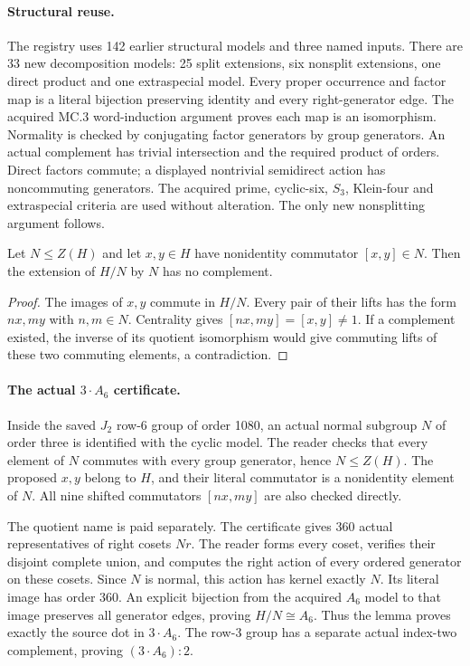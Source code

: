 \documentclass[11pt]{article}
\begin{document}
\paragraph{Structural reuse.}
The registry uses 142 earlier structural models and three named inputs.
There are 33 new decomposition models: 25 split extensions, six nonsplit
extensions, one direct product and one extraspecial model.
Every proper occurrence and factor map is a literal bijection preserving
identity and every right-generator edge. The acquired MC.3 word-induction
argument proves each map is an isomorphism. Normality is checked by
conjugating factor generators by group generators. An actual complement
has trivial intersection and the required product of orders. Direct factors
commute; a displayed nontrivial semidirect action has noncommuting generators.
The acquired prime, cyclic-six, $S_3$, Klein-four and extraspecial criteria
are used without alteration. The only new nonsplitting argument follows.

\newpage
\begin{lemma}
Let $N\leq Z(H)$ and let $x,y\in H$ have nonidentity commutator
$[x,y]\in N$. Then the extension of $H/N$ by $N$ has no complement.
\end{lemma}
\begin{proof}
The images of $x,y$ commute in $H/N$. Every pair of their lifts has the
form $nx,my$ with $n,m\in N$. Centrality gives
$[nx,my]=[x,y]\ne1$. If a complement existed, the inverse of its quotient
isomorphism would give commuting lifts of these two commuting elements,
a contradiction.
\end{proof}

\paragraph{The actual $3\mathbin{\cdot}A_6$ certificate.}
Inside the saved $J_2$ row-6 group of order 1080, an actual normal subgroup
$N$ of order three is identified with the cyclic model. The reader checks
that every element of $N$ commutes with every group generator, hence
$N\leq Z(H)$. The proposed $x,y$ belong to $H$, and their literal
commutator is a nonidentity element of $N$. All nine shifted commutators
$[nx,my]$ are also checked directly.

The quotient name is paid separately. The certificate gives 360 actual
representatives of right cosets $Nr$. The reader forms every coset, verifies
their disjoint complete union, and computes the right action of every
ordered generator on these cosets. Since $N$ is normal, this action has
kernel exactly $N$. Its literal image has order 360. An explicit bijection
from the acquired $A_6$ model to that image preserves all generator edges,
proving $H/N\cong A_6$. Thus the lemma proves exactly the source dot in
$3\mathbin{\cdot}A_6$. The row-3 group has a separate actual index-two
complement, proving $(3\mathbin{\cdot}A_6):2$.
\end{document}
